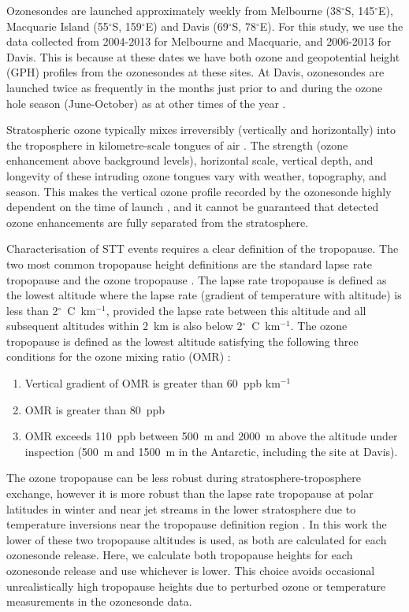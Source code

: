 \documentclass{article}
\begin{document}
    Ozonesondes are launched approximately weekly from Melbourne (38$^{\circ}$S, 145$^{\circ}$E), Macquarie Island (55$^{\circ}$S, 159$^{\circ}$E) and Davis (69$^{\circ}$S, 78$^{\circ}$E). 
    For this study, we use the data collected from 2004-2013 for Melbourne and Macquarie, and 2006-2013 for Davis.
    This is because at these dates we have both ozone and geopotential height (GPH) profiles from the ozonesondes at these sites.
    At Davis, ozonesondes are launched twice as frequently in the months just prior to and during the ozone hole season (June-October) as at other times of the year \citep{Alexander2013}.
    
    Stratospheric ozone typically mixes irreversibly (vertically and horizontally) into the troposphere in kilometre-scale tongues of air \citep{Frey2015}.
    The strength (ozone enhancement above background levels), horizontal scale, vertical depth, and longevity of these intruding ozone tongues vary with weather, topography, and season.
    This makes the vertical ozone profile recorded by the ozonesonde highly dependent on the time of launch \citep{Sprenger2003}, and it cannot be guaranteed that detected ozone enhancements are fully separated from the stratosphere.
    
    Characterisation of STT events requires a clear definition of the tropopause.
    The two most common tropopause height definitions are the standard lapse rate tropopause \citep{WMO1957} and the ozone tropopause \citep{Bethan1996}.
    The lapse rate tropopause is defined as the lowest altitude where the lapse rate (gradient of temperature with altitude) is less than 2$^\circ$~C~km$^{-1}$, provided the lapse rate between this altitude and all subsequent altitudes within 2~km is also below 2$^\circ$~C~km$^{-1}$.
    The ozone tropopause is defined as the lowest altitude satisfying the following three conditions for the ozone mixing ratio (OMR)  \citep{Bethan1996}:
    \begin{enumerate}
      \item Vertical gradient of OMR is greater than 60~ppb km$^{-1}$
      \item OMR is greater than 80~ppb
      \item OMR exceeds 110~ppb between 500~m and 2000~m above the altitude under inspection (500~m and 1500~m in the Antarctic, including the site at Davis).
    \end{enumerate}
    The ozone tropopause can be less robust during stratosphere-troposphere exchange, however it is more robust than the lapse rate tropopause at polar latitudes in winter and near jet streams in the lower stratosphere due to temperature inversions near the tropopause definition region \citep{Bethan1996, Tomikawa2009, Alexander2013}.
    In this work the lower of these two tropopause altitudes is used, as both are calculated for each ozonesonde release.
    Here, we calculate both tropopause heights for each ozonesonde release and use whichever is lower.
    This choice avoids occasional unrealistically high tropopause heights due to perturbed ozone or temperature measurements in the ozonesonde data.
    
\end{document}
